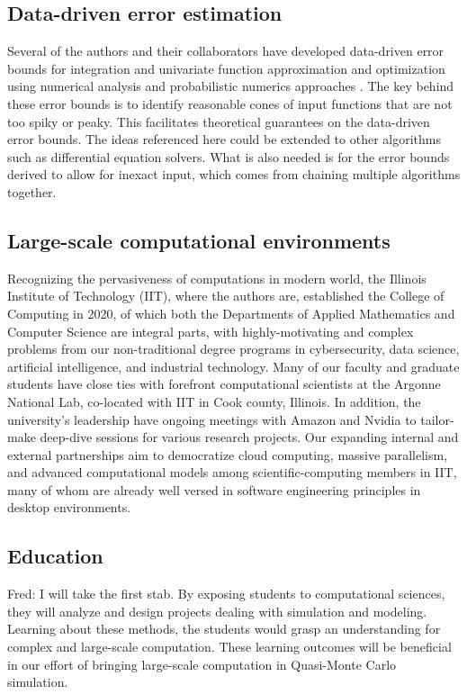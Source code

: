 \documentclass{amsart}
\newcommand{\FJHNote}[1]{{\color{blue}Fred: #1}}
\begin{document}
\subsection{Data-driven error estimation} 
Several of the authors and their collaborators have developed data-driven error bounds for integration and univariate function approximation and optimization using numerical analysis and probabilistic numerics approaches \cite{ChoEtal17a, HicEtal14b, HicEtal14a, HicJim16a, RatHic19a,JimHic16a}.  The key behind these error bounds is to identify reasonable cones of input functions that are not too spiky or peaky.  This facilitates theoretical guarantees on the data-driven error bounds.  The ideas referenced here could be extended to other algorithms such as differential equation solvers.  What is also needed is for the error bounds derived to allow for inexact input, which comes from chaining multiple algorithms together.

\subsection{Large-scale computational environments}  Recognizing the pervasiveness of computations in modern world,  the Illinois Institute of Technology (IIT), where the authors are,  established the College of Computing in 2020, of which both the Departments of Applied Mathematics and Computer Science are integral parts, with highly-motivating and complex problems from our non-traditional degree programs in cybersecurity, data science, artificial intelligence, and industrial technology. Many of our faculty and graduate students have close ties with forefront computational scientists at the Argonne National Lab, co-located with IIT in Cook county, Illinois. In addition, the university's leadership have ongoing meetings with Amazon and Nvidia to tailor-make deep-dive sessions for various research projects. Our expanding internal and external partnerships aim to democratize cloud computing, massive parallelism, and advanced computational models among scientific-computing members in IIT, many of whom are already well versed in software engineering principles in desktop environments.

\subsection{Education} \FJHNote{I will take the first stab.} %
By exposing students to computational sciences, they will analyze and design projects dealing with simulation and modeling. Learning about these methods, the students would grasp an understanding for complex and large-scale computation. These learning outcomes will be beneficial in our effort of bringing large-scale computation in Quasi-Monte Carlo simulation.
\end{document}
